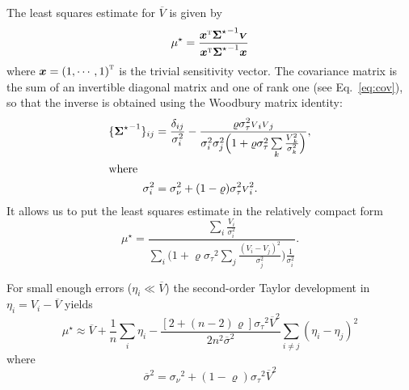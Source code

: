 \documentclass[twocolumn]{article}
\def\vec#1{\ensuremath{\boldsymbol{#1}}}
\def\tr#1{\ensuremath{{#1}^\text{\textsc{t}}}}
\def\ppp#1{#1^\star}
\def\norm{_\tau}
\def\meas{_\nu}
\def\mean#1{\overline{#1}}
\def\data{\ensuremath{{\scriptstyle V}}}
\def\vdata{\ensuremath{\vec\data}}
\def\datamean{\ensuremath{\mean\data}}
\def\mod{\ensuremath{\mu}}
\def\error{\ensuremath{\eta}}
\def\dev{\ensuremath{\sigma}}
\def\devmean{\ensuremath{\mean\dev}}
\def\reldev{\ensuremath{\dev\norm}}
\def\absdev{\ensuremath{\dev\meas}}
\def\cov{\ensuremath{\Sigma}}
\def\vcov{\ensuremath{\vec\cov}}
\def\corr{\ensuremath{\varrho}}
\def\sens{\ensuremath{x}}
\def\vsens{\ensuremath{\vec\sens}}
\begin{document}
The least squares estimate for $\datamean$ is given by
\begin{equation}
    \ppp{\mod} =
                  \frac { \tr\vsens{\ppp\vcov}^{-1}\vdata }
                        { \tr\vsens{\ppp\vcov}^{-1}\vsens }
\end{equation}
where $\vsens = \tr{(1, \cdots, 1)}$ is the trivial sensitivity vector.  The covariance matrix is the sum of an invertible diagonal matrix and one of rank one (see Eq.~\ref{eq:cov}), so that the inverse is obtained using the Woodbury matrix identity: 
\begin{align}
    \{ {\ppp\vcov}^{-1} \}_{ij} &= \frac{\delta_{ij}}{\dev_i^2}
         - \frac{\corr\reldev^2\data_i\data_j}
                {\dev_i^2\dev_j^2\Big(1 + 
            \corr\reldev^2\sum\limits_{k} \frac{\data_k^2}{\dev_k^2}\Big)},\\
  \intertext{where}
  \dev_i^2 &= \absdev^2+(1-\corr)\reldev^2\data_i^2.
\end{align}
It allows us to put the least squares estimate in the relatively compact form 
\begin{equation}
  \ppp{\mod} = 
    \frac { 
      \sum\limits_i \frac{\data_i}{\dev_i^2}
    }{ 
      \sum\limits_i 
          \Big( 1   
             + \corr\reldev^2\sum\limits_{j} \frac{(\data_i-\data_j)^2}{\dev_j^2}
           \Big)
          \frac{1}{\dev_i^2} 
   }.\label{eq:mu}
\end{equation}


For small enough errors ($\error_i \ll \datamean$) the second-order Taylor development in $\error_i = \data_i - \datamean$ yields 
\begin{equation}
    \ppp{\mod} \approx  \datamean 
                  +\frac1n {\sum\limits_i \error_i}
                       - \frac {[2 + (n - 2)\corr]\reldev^2\datamean^2
                          }{
                           2n^2 \devmean^2             
                          }
                           \sum\limits_{i\ne j} (\error_i-\error_j)^2
\end{equation}
where
\begin{equation}
    \devmean^2 = \absdev^2+(1-\corr)\reldev^2\datamean^2 
\end{equation}
\end{document}
